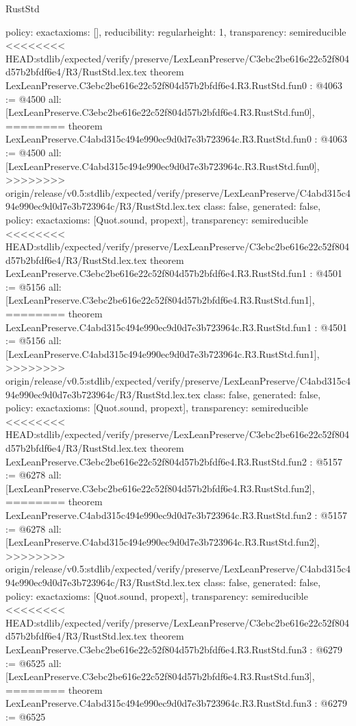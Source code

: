 \begin{lexlean}{RustStd}
\begin{coremodule}
{\begin{coremodule}
{{{  policy: exact{axioms: []},
  reducibility: regular{height: 1},
  transparency: semireducible
}
<<<<<<<< HEAD:stdlib/expected/verify/preserve/LexLeanPreserve/C3ebc2be616e22c52f804d57b2bfdf6e4/R3/RustStd.lex.tex
theorem LexLeanPreserve.C3ebc2be616e22c52f804d57b2bfdf6e4.R3.RustStd.fun0 : @4063 := @4500 {
  all: [LexLeanPreserve.C3ebc2be616e22c52f804d57b2bfdf6e4.R3.RustStd.fun0],
========
theorem LexLeanPreserve.C4abd315c494e990ec9d0d7e3b723964c.R3.RustStd.fun0 : @4063 := @4500 {
  all: [LexLeanPreserve.C4abd315c494e990ec9d0d7e3b723964c.R3.RustStd.fun0],
>>>>>>>> origin/release/v0.5:stdlib/expected/verify/preserve/LexLeanPreserve/C4abd315c494e990ec9d0d7e3b723964c/R3/RustStd.lex.tex
  class: false,
  generated: false,
  policy: exact{axioms: [Quot.sound, propext]},
  transparency: semireducible
}
<<<<<<<< HEAD:stdlib/expected/verify/preserve/LexLeanPreserve/C3ebc2be616e22c52f804d57b2bfdf6e4/R3/RustStd.lex.tex
theorem LexLeanPreserve.C3ebc2be616e22c52f804d57b2bfdf6e4.R3.RustStd.fun1 : @4501 := @5156 {
  all: [LexLeanPreserve.C3ebc2be616e22c52f804d57b2bfdf6e4.R3.RustStd.fun1],
========
theorem LexLeanPreserve.C4abd315c494e990ec9d0d7e3b723964c.R3.RustStd.fun1 : @4501 := @5156 {
  all: [LexLeanPreserve.C4abd315c494e990ec9d0d7e3b723964c.R3.RustStd.fun1],
>>>>>>>> origin/release/v0.5:stdlib/expected/verify/preserve/LexLeanPreserve/C4abd315c494e990ec9d0d7e3b723964c/R3/RustStd.lex.tex
  class: false,
  generated: false,
  policy: exact{axioms: [Quot.sound, propext]},
  transparency: semireducible
}
<<<<<<<< HEAD:stdlib/expected/verify/preserve/LexLeanPreserve/C3ebc2be616e22c52f804d57b2bfdf6e4/R3/RustStd.lex.tex
theorem LexLeanPreserve.C3ebc2be616e22c52f804d57b2bfdf6e4.R3.RustStd.fun2 : @5157 := @6278 {
  all: [LexLeanPreserve.C3ebc2be616e22c52f804d57b2bfdf6e4.R3.RustStd.fun2],
========
theorem LexLeanPreserve.C4abd315c494e990ec9d0d7e3b723964c.R3.RustStd.fun2 : @5157 := @6278 {
  all: [LexLeanPreserve.C4abd315c494e990ec9d0d7e3b723964c.R3.RustStd.fun2],
>>>>>>>> origin/release/v0.5:stdlib/expected/verify/preserve/LexLeanPreserve/C4abd315c494e990ec9d0d7e3b723964c/R3/RustStd.lex.tex
  class: false,
  generated: false,
  policy: exact{axioms: [Quot.sound, propext]},
  transparency: semireducible
}
<<<<<<<< HEAD:stdlib/expected/verify/preserve/LexLeanPreserve/C3ebc2be616e22c52f804d57b2bfdf6e4/R3/RustStd.lex.tex
theorem LexLeanPreserve.C3ebc2be616e22c52f804d57b2bfdf6e4.R3.RustStd.fun3 : @6279 := @6525 {
  all: [LexLeanPreserve.C3ebc2be616e22c52f804d57b2bfdf6e4.R3.RustStd.fun3],
========
theorem LexLeanPreserve.C4abd315c494e990ec9d0d7e3b723964c.R3.RustStd.fun3 : @6279 := @6525 {
}}}}}}}
\end{coremodule}}
\end{coremodule}
\end{lexlean}
